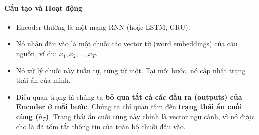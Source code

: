 \paragraph{Cấu tạo và Hoạt động}
\begin{itemize}
    \item Encoder thường là một mạng RNN (hoặc LSTM, GRU).
    \item Nó nhận đầu vào là một chuỗi các vector từ (word embeddings) của câu nguồn, ví dụ: $x_1, x_2, \dots, x_T$.
    \item Nó xử lý chuỗi này tuần tự, từng từ một. Tại mỗi bước, nó cập nhật trạng thái ẩn của mình.
    \item Điều quan trọng là chúng ta \textbf{bỏ qua tất cả các đầu ra (outputs) của Encoder ở mỗi bước}. Chúng ta chỉ quan tâm đến \textbf{trạng thái ẩn cuối cùng ($h_T$)}. Trạng thái ẩn cuối cùng này chính là vector ngữ cảnh, vì nó được cho là đã tóm tắt thông tin của toàn bộ chuỗi đầu vào.
\end{itemize}
